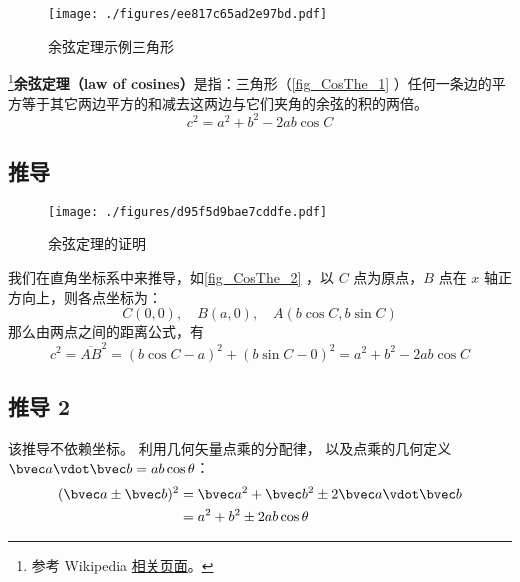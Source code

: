 
\begin{figure}[ht]
\centering
\texttt{[image: ./figures/ee817c65ad2e97bd.pdf]}
\caption{余弦定理示例三角形} \label{fig_CosThe_1}
\end{figure}

\footnote{参考 Wikipedia \href{https://en.wikipedia.org/wiki/Law_of_cosines}{相关页面}。}\textbf{余弦定理（law of cosines）}是指：三角形（\autoref{fig_CosThe_1} ）任何一条边的平方等于其它两边平方的和减去这两边与它们夹角的余弦的积的两倍。
\begin{equation}\label{eq_CosThe_1}
c^2=a^2 + b^2 - 2ab\cos C
\end{equation}


\subsection{推导}
\begin{figure}[ht]
\centering
\texttt{[image: ./figures/d95f5d9bae7cddfe.pdf]}
\caption{余弦定理的证明} \label{fig_CosThe_2}
\end{figure}
我们在直角坐标系中来推导，如\autoref{fig_CosThe_2} ，以 $C$ 点为原点，$B$ 点在 $x$ 轴正方向上，则各点坐标为：
\begin{equation}
C(0,0),\quad B(a,0),\quad A(b\cos C,b\sin C)
\end{equation}
那么由两点之间的距离公式，有
\begin{equation}
c^2=\overline{AB}^2=(b\cos C-a)^2+(b\sin C-0)^2=a^2+b^2-2ab\cos C
\end{equation}

\subsection{推导 2}
该推导不依赖坐标。 利用几何矢量点乘的分配律， 以及点乘的几何定义 $\bvec a \vdot \bvec b = ab\cos\theta$：
\begin{equation}\label{eq_CosThe_2}
\begin{aligned}
(\bvec a \pm \bvec b)^2 &= \bvec a^2 + \bvec b^2 \pm 2\bvec a \vdot \bvec b\\
&= a^2 + b^2 \pm 2ab \cos\theta
\end{aligned}
\end{equation}
